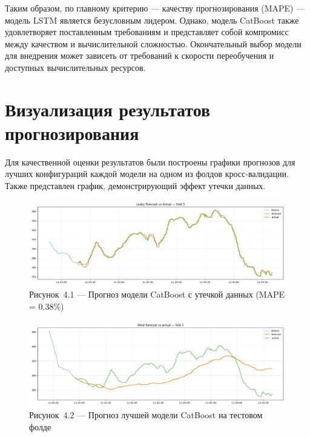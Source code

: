 \hspace*{1.25cm}Таким образом, по главному критерию — качеству прогнозирования (MAPE) — модель LSTM является безусловным лидером. Однако, модель CatBoost также удовлетворяет поставленным требованиям и представляет собой компромисс между качеством и вычислительной сложностью. Окончательный выбор модели для внедрения может зависеть от требований к скорости переобучения и доступных вычислительных ресурсов.

\section{Визуализация результатов прогнозирования}
\label{sec:viz_results}

\hspace*{1.25cm}Для качественной оценки результатов были построены графики прогнозов для лучших конфигураций каждой модели на одном из фолдов кросс-валидации. Также представлен график, демонстрирующий эффект утечки данных.

\begin{figure}[H]
	\centering
	\includegraphics[width=\textwidth]{figures/chapter4/catboost_leakage_forecast.png}
	\caption*{Рисунок~4.1 — Прогноз модели CatBoost с утечкой данных (MAPE = 0.38\%)}
	\label{fig:catboost_leakage_forecast}
\end{figure}

\begin{figure}[H]
	\centering
	\includegraphics[width=\textwidth]{figures/chapter4/catboost_forecast.png}
	\caption*{Рисунок~4.2 — Прогноз лучшей модели CatBoost на тестовом фолде}
	\label{fig:catboost_forecast}
\end{figure}

